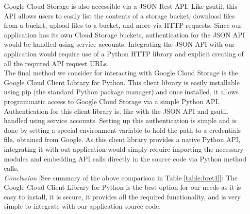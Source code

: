 \documentclass[10pt, onecolumn, draftclsnofoot, letterpaper, compsoc]{IEEEtran}
\begin{document}
Google Cloud Storage is also accessible via a JSON Rest API. Like gsutil, this API
allows users to easily list the contents of a storage bucket, download files from
a bucket, upload files to a bucket, and more via HTTP requests\cite{cloudStorageJSON}.
Since our application has its own Cloud Storage buckets, authentication for the
JSON API would be handled using service accounts\cite{cloudStorageJSON}. Integrating
the JSON API with our application would require use of a Python HTTP library and explicit creating
of all the required API request URLs\cite{cloudStorageJSON}. \\

The final method we consider for interacting with Google Cloud Storage is the
Google Cloud Client Library for Python. This client library is easily
installable using pip (the standard Python package manager) and once installed,
it allows programmatic access to Google Cloud Storage via a simple Python
API\cite{cloudStorageLib}. Authentication for this client library is, like with
the JSON API and gsutil, handled using service accounts\cite{cloudStorageLib}.
Setting up this authentication is simple and is done by setting a special
environment variable to hold the path to a credentials file, obtained from
Google\cite{cloudStorageLib}. As this client library provides a native Python
API, integrating it with out application would simply require importing the
necessary modules and embedding API calls directly in the source code via
Python method calls\cite{cloudStorageLib}. \\

\textit{Conclusion} [See summary of the above comparison in Table \ref{table:bret1}]:
The Google Cloud Client Library for Python is the best
option for our needs as it is easy to install, it is secure, it provides all the
required functionality, and is very simple to integrate with our application
source code. \\
\end{document}

